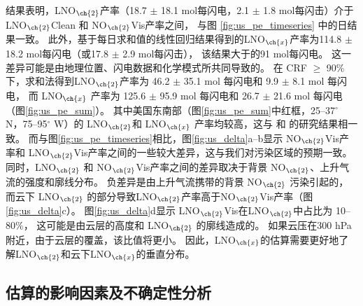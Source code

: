 结果表明，LNO$_{\ch{2}}$产率（18.7 $\pm$ 18.1 mol每闪电，2.1 $\pm$ 1.8 mol每闪击）介于 LNO$_{\ch{2}}$Clean 和 NO$_{\ch{2}}$Vis产率之间，
与图 \ref{fig:us_pe_timeseries} 中的日结果一致。
此外，基于每日求和值的线性回归结果得到的LNO$_{\ch{x}}$产率为114.8 $\pm$ 18.2 mol每闪电（或17.8 $\pm$ 2.9 mol每闪击），
该结果大于\citet{Pickering.2016}的91 mol每闪电。
这一差异可能是由地理位置、闪电数据和化学模式所共同导致的。
在 CRF $\geq$ 90\% 下，求和法得到LNO$_{\ch{2}}$产率为 46.2 $\pm$ 35.1 mol 每闪电和 9.9 $\pm$ 8.1 mol 每闪电，
而 LNO$_{\ch{x}}$ 产率为 125.6 $\pm$ 95.9 mol 每闪电和 26.7 $\pm$ 21.6 mol 每闪电（图\ref{fig:us_pe_sum}）。
其中美国东南部（图\ref{fig:us_pe_sum}中红框，25--37$^{\circ}$ N，75--95$^{\circ}$ W）的 LNO$_{\ch{2}}$和 LNO$_{\ch{x}}$ 产率均较高，这与\citet{Lapierre.2020} 和 \citet{Bucsela.2019}的研究结果相一致。
而与图\ref{fig:us_pe_timeseries}相比，图\ref{fig:us_delta}a--b显示
NO$_{\ch{2}}$Vis产率和 LNO$_{\ch{2}}$Vis产率之间的一些较大差异，这与我们对污染区域的预期一致。
同时，LNO$_{\ch{2}}$ 和 NO$_{\ch{2}}$Vis产率之间的差异取决于背景 NO$_{\ch{2}}$、上升气流的强度和廓线分布。
负差异是由上升气流携带的背景 NO$_{\ch{2}}$ 污染引起的，
而云下 LNO$_{\ch{2}}$ 的部分导致LNO$_{\ch{2}}$产率高于NO$_{\ch{2}}$Vis产率（图\ref{fig:us_delta}c）。
图\ref{fig:us_delta}d显示 LNO$_{\ch{2}}$Vis在LNO$_{\ch{2}}$中占比为 10--80\%，
这可能是由云层的高度和 LNO$_{\ch{2}}$ 的廓线造成的。
如果云压在300 hPa附近，由于云层的覆盖，该比值将更小。
因此，LNO$_{\ch{x}}$的估算需要更好地了解LNO$_{\ch{2}}$和云下LNO$_{\ch{x}}$的垂直分布。

\subsection{估算的影响因素及不确定性分析} \label{sec:uncertainty}

